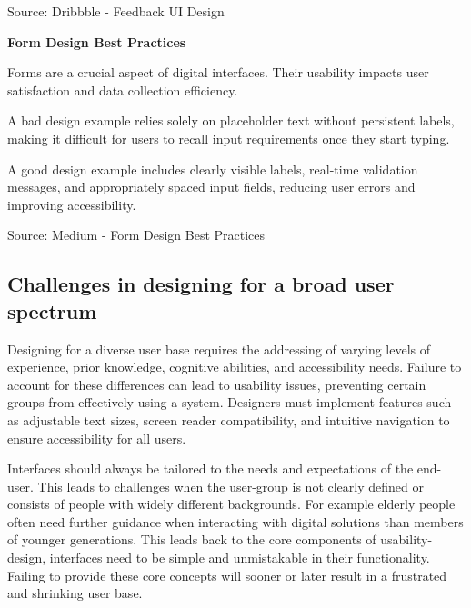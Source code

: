 Source: Dribbble - Feedback UI Design

\textbf{Form Design Best Practices}

Forms are a crucial aspect of digital interfaces. Their usability impacts user satisfaction and data collection efficiency.

A bad design example relies solely on placeholder text without persistent labels, making it difficult for users to recall input requirements once they start typing.

A good design example includes clearly visible labels, real-time validation messages, and appropriately spaced input fields, reducing user errors and improving accessibility.

Source: Medium - Form Design Best Practices

\subsection{Challenges in designing for a broad user spectrum}

Designing for a diverse user base requires the addressing of varying levels of experience, prior knowledge, cognitive abilities, and accessibility needs. Failure to account for these differences can lead to usability issues, preventing certain groups from effectively using a system. Designers must implement features such as adjustable text sizes, screen reader compatibility, and intuitive navigation to ensure accessibility for all users.

\blankLine

Interfaces should always be tailored to the needs and expectations of the end-user. This leads to challenges when the user-group is not clearly defined or consists of people with widely different backgrounds. For example elderly people often need further guidance when interacting with digital solutions than members of younger generations. This leads back to the core components of usability-design, interfaces need to be simple and unmistakable in their functionality. Failing to provide these core concepts will sooner or later result in a frustrated and shrinking user base. 
\autocite{Paul:UIUXIntroduction}

\blankLine



\newpage